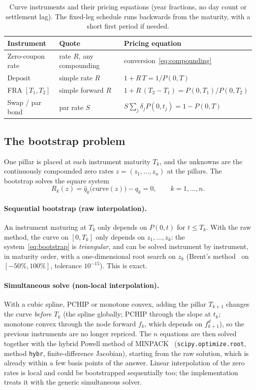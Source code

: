 \documentclass[11pt,a4paper]{article}
\theoremstyle{plain}
\theoremstyle{definition}
\begin{document}
\begin{table}[htbp]
\centering
\begin{tabular}{@{}lll@{}}
\toprule
Instrument & Quote & Pricing equation \\
\midrule
Zero-coupon rate & rate $R$, any compounding & conversion~\eqref{eq:compounding} \\
Deposit & simple rate $R$ & $1+R\,T=1/P(0,T)$ \\
FRA $[T_1,T_2]$ & simple forward $R$ & $1+R\,(T_2-T_1)=P(0,T_1)/P(0,T_2)$ \\
Swap / par bond & par rate $S$ & $S\sum_j\delta_jP(0,t_j)=1-P(0,T)$ \\
\bottomrule
\end{tabular}
\caption{Curve instruments and their pricing equations (year fractions, no day count or settlement lag). The fixed-leg schedule runs backwards from the maturity, with a short first period if needed.}
\label{tab:instruments}
\end{table}

\subsection{The bootstrap problem}
One pillar is placed at each instrument maturity $T_k$, and the unknowns are the continuously compounded zero rates $z=(z_1,\dots,z_n)$ at the pillars. The bootstrap solves the square system
\begin{equation}
    R_k(z)=\hat q_k\bigl(\text{curve}(z)\bigr)-q_k=0,\qquad k=1,\dots,n.
    \label{eq:bootstrap}
\end{equation}

\paragraph{Sequential bootstrap (raw interpolation).} An instrument maturing at $T_k$ only depends on $P(0,t)$ for $t\le T_k$. With the raw method, the curve on $[0,T_k]$ only depends on $z_1,\dots,z_k$: the system~\eqref{eq:bootstrap} is \emph{triangular}, and can be solved instrument by instrument, in maturity order, with a one-dimensional root search on $z_k$ (Brent's method~\cite{brent} on $[-50\%,100\%]$, tolerance $10^{-15}$). This is exact.

\paragraph{Simultaneous solve (non-local interpolation).} With a cubic spline, PCHIP or monotone convex, adding the pillar $T_{k+1}$ changes the curve \emph{before} $T_k$ (the spline globally; PCHIP through the slope at $t_k$; monotone convex through the node forward $f_k$, which depends on $f^d_{k+1}$), so the previous instruments are no longer repriced. The $n$ equations are then solved together with the hybrid Powell method of MINPACK~\cite{powell} (\texttt{scipy.optimize.root}, method \texttt{hybr}, finite-difference Jacobian), starting from the raw solution, which is already within a few basis points of the answer. Linear interpolation of the zero rates is local and could be bootstrapped sequentially too; the implementation treats it with the generic simultaneous solver.
\end{document}
